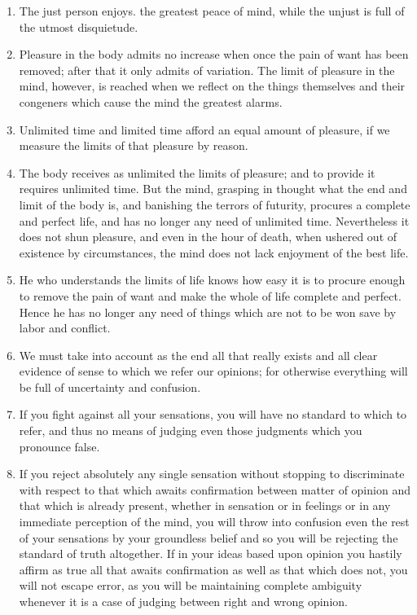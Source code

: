 \documentclass[12pt]{article}
\begin{document}
\begin{enumerate}[leftmargin=.5cm]
	\item The just person enjoys. the greatest peace of mind, while the unjust is full of the utmost disquietude. 

	\item Pleasure in the body admits no increase when once the pain of want has been removed; after that it only admits of variation. The limit of pleasure in the mind, however, is reached when we reflect on the things themselves and their congeners which cause the mind the greatest alarms. 

	\item Unlimited time and limited time afford an equal amount of pleasure, if we measure the limits of that pleasure by reason. 

	\item The body receives as unlimited the limits of pleasure; and to provide it requires unlimited time. But the mind, grasping in thought what the end and limit of the body is, and banishing the terrors of futurity, procures a complete and perfect life, and has no longer any need of unlimited time. Nevertheless it does not shun pleasure, and even in the hour of death, when ushered out of existence by circumstances, the mind does not lack enjoyment of the best life. 

	\item He who understands the limits of life knows how easy it is to procure enough to remove the pain of want and make the whole of life complete and perfect. Hence he has no longer any need of things which are not to be won save by labor and conflict. 

	\item We must take into account as the end all that really exists and all clear evidence of sense to which we refer our opinions; for otherwise everything will be full of uncertainty and confusion. 

	\item If you fight against all your sensations, you will have no standard to which to refer, and thus no means of judging even those judgments which you pronounce false. 

	\item If you reject absolutely any single sensation without stopping to discriminate with respect to that which awaits confirmation between matter of opinion and that which is already present, whether in sensation or in feelings or in any immediate perception of the mind, you will throw into confusion even the rest of your sensations by your groundless belief and so you will be rejecting the standard of truth altogether. If in your ideas based upon opinion you hastily affirm as true all that awaits confirmation as well as that which does not, you will not escape error, as you will be maintaining complete ambiguity whenever it is a case of judging between right and wrong opinion. 


\end{enumerate}
\end{document}
